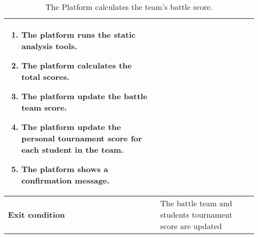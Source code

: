 \begin{enumerate}[label=\textbf{UC\arabic*}:,leftmargin=1.3cm]
\begin{table}[H]
\begin{tabular}{|l|p{11.9cm}|}
\begin{enumerate}[label=\arabic*.]
                      \item The platform runs the static analysis tools.
                      \item The platform calculates the total scores.
                      \item The platform update the battle team score.
                      \item The platform update the personal tournament score for each student in the team.
                      \item The platform shows a confirmation message.
                  \end{enumerate} \\\hline
                  \textbf{Exit condition}  & The battle team and students tournament score are updated                                                             \\\hline
              \end{tabular}
              \caption{The Platform calculates the team's battle score.}
              \label{table:Subscribe to tournament from notification}
          \end{table}


\end{enumerate}
